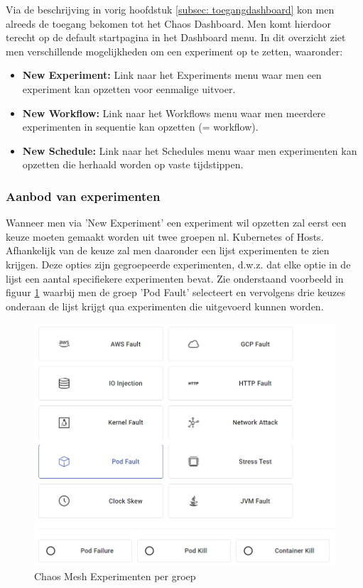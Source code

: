 Via de beschrijving in vorig hoofdstuk \ref{subsec: toegangdashboard} kon men alreeds de toegang bekomen tot het Chaos Dashboard. Men komt hierdoor terecht op de default startpagina in het Dashboard menu. In dit overzicht ziet men verschillende mogelijkheden om een experiment op te zetten, waaronder: 
\begin{itemize}
    \item {\bf New Experiment:} Link naar het Experiments menu waar men een experiment kan opzetten voor eenmalige uitvoer.
    \item {\bf New Workflow:} Link naar het Workflows menu waar men meerdere experimenten in sequentie kan opzetten (= workflow). 
    \item {\bf New Schedule:} Link naar het Schedules menu waar men experimenten kan opzetten die herhaald worden op vaste tijdstippen. 
\end{itemize}

\subsubsection{Aanbod van experimenten}

Wanneer men via 'New Experiment' een experiment wil opzetten zal eerst een keuze moeten gemaakt worden uit twee groepen nl. Kubernetes of Hosts. Afhankelijk van de keuze zal men daaronder een lijst experimenten te zien krijgen. Deze opties zijn gegroepeerde experimenten, d.w.z. dat elke optie in de lijst een aantal specifiekere experimenten bevat. Zie onderstaand voorbeeld in figuur \ref{img:chaosmeshexperimenten} waarbij men de groep 'Pod Fault' selecteert en vervolgens drie keuzes onderaan de lijst krijgt qua experimenten die uitgevoerd kunnen worden. 

\begin{figure}[h]
    \centering
    \includegraphics[scale=.7]{img/chaosmesh-experimenten.png}
    \caption{Chaos Mesh Experimenten per groep}
    \label{img:chaosmeshexperimenten}
\end{figure}

